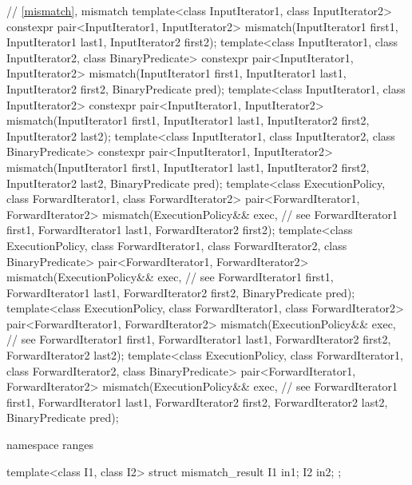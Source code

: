 \begin{codeblock}
  // \ref{mismatch}, mismatch
  template<class InputIterator1, class InputIterator2>
    constexpr pair<InputIterator1, InputIterator2>
      mismatch(InputIterator1 first1, InputIterator1 last1,
               InputIterator2 first2);
  template<class InputIterator1, class InputIterator2, class BinaryPredicate>
    constexpr pair<InputIterator1, InputIterator2>
      mismatch(InputIterator1 first1, InputIterator1 last1,
               InputIterator2 first2, BinaryPredicate pred);
  template<class InputIterator1, class InputIterator2>
    constexpr pair<InputIterator1, InputIterator2>
      mismatch(InputIterator1 first1, InputIterator1 last1,
               InputIterator2 first2, InputIterator2 last2);
  template<class InputIterator1, class InputIterator2, class BinaryPredicate>
    constexpr pair<InputIterator1, InputIterator2>
      mismatch(InputIterator1 first1, InputIterator1 last1,
               InputIterator2 first2, InputIterator2 last2,
               BinaryPredicate pred);
  template<class ExecutionPolicy, class ForwardIterator1, class ForwardIterator2>
    pair<ForwardIterator1, ForwardIterator2>
      mismatch(ExecutionPolicy&& exec, // see 
               ForwardIterator1 first1, ForwardIterator1 last1,
               ForwardIterator2 first2);
  template<class ExecutionPolicy, class ForwardIterator1, class ForwardIterator2,
           class BinaryPredicate>
    pair<ForwardIterator1, ForwardIterator2>
      mismatch(ExecutionPolicy&& exec, // see 
               ForwardIterator1 first1, ForwardIterator1 last1,
               ForwardIterator2 first2, BinaryPredicate pred);
  template<class ExecutionPolicy, class ForwardIterator1, class ForwardIterator2>
    pair<ForwardIterator1, ForwardIterator2>
      mismatch(ExecutionPolicy&& exec, // see 
               ForwardIterator1 first1, ForwardIterator1 last1,
               ForwardIterator2 first2, ForwardIterator2 last2);
  template<class ExecutionPolicy, class ForwardIterator1, class ForwardIterator2,
           class BinaryPredicate>
    pair<ForwardIterator1, ForwardIterator2>
      mismatch(ExecutionPolicy&& exec, // see 
               ForwardIterator1 first1, ForwardIterator1 last1,
               ForwardIterator2 first2, ForwardIterator2 last2,
               BinaryPredicate pred);
\end{codeblock}\begin{addedblock}\begin{codeblock}
  namespace ranges {
    template<class I1, class I2>
    struct mismatch_result {
      I1 in1;
      I2 in2;
    };

}
\end{codeblock}
\end{addedblock}
